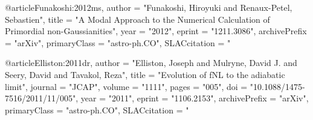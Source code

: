 @article{Funakoshi:2012ms,
      author         = "Funakoshi, Hiroyuki and Renaux-Petel, Sebastien",
      title          = "{A Modal Approach to the Numerical Calculation of
                        Primordial non-Gaussianities}",
      year           = "2012",
      eprint         = "1211.3086",
      archivePrefix  = "arXiv",
      primaryClass   = "astro-ph.CO",
      SLACcitation   = "%
}

@article{Elliston:2011dr,
      author         = "Elliston, Joseph and Mulryne, David J. and Seery, David
                        and Tavakol, Reza",
      title          = "{Evolution of fNL to the adiabatic limit}",
      journal        = "JCAP",
      volume         = "1111",
      pages          = "005",
      doi            = "10.1088/1475-7516/2011/11/005",
      year           = "2011",
      eprint         = "1106.2153",
      archivePrefix  = "arXiv",
      primaryClass   = "astro-ph.CO",
      SLACcitation   = "%
}

